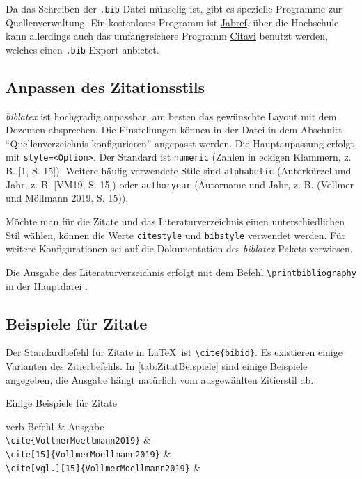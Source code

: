 Da das Schreiben der \verb|.bib|-Datei mühselig ist, gibt es spezielle Programme zur Quellenverwaltung. Ein kostenloses Programm ist \href{https://www.jabref.org/}{Jabref}, über die Hochschule kann allerdings auch das umfangreichere Programm \href{https://www.citavi.com/de}{Citavi} benutzt werden, welches einen \verb|.bib| Export anbietet.

\subsection{Anpassen des Zitationsstils}
\textit{biblatex} ist hochgradig anpassbar, am besten das gewünschte Layout mit dem Dozenten absprechen. Die Einstellungen können in der Datei  in dem Abschnitt \enquote{Quellenverzeichnis konfigurieren} angepasst werden. Die Hauptanpassung erfolgt mit \verb|style=<Option>|. Der Standard ist \verb|numeric| (Zahlen in eckigen Klammern, z. B. [1, S. 15]). Weitere häufig verwendete Stile sind \verb|alphabetic| (Autorkürzel und Jahr, z. B. [VM19, S. 15]) oder \verb|authoryear| (Autorname und Jahr, z. B. (Vollmer und Möllmann 2019, S. 15)).

Möchte man für die Zitate und das Literaturverzeichnis einen unterschiedlichen Stil wählen, können die Werte \verb|citestyle| und \verb|bibstyle| verwendet werden. Für weitere Konfigurationen sei auf die Dokumentation des \textit{biblatex} Pakets verwiesen.

Die Ausgabe des Literaturverzeichnis erfolgt mit dem Befehl \verb|\printbibliography| in der Hauptdatei .
 
\subsection{Beispiele für Zitate}
Der Standardbefehl für Zitate in \LaTeX\ ist \verb|\cite{bibid}|. Es existieren einige Varianten des Zitierbefehls. In \vref{tab:ZitatBeispiele} sind einige Beispiele angegeben, die Ausgabe hängt natürlich vom ausgewählten Zitierstil ab.

\begin{table}[h]
\centering
\caption{Einige Beispiele für Zitate}
\label{tab:ZitatBeispiele}
\begin{tblr}{verb}
	\toprule
	 Befehl & Ausgabe \\ \midrule
	\verb|\cite{VollmerMoellmann2019}| & \cite{VollmerMoellmann2019} \\
	\verb|\cite[15]{VollmerMoellmann2019}| & \cite[15]{VollmerMoellmann2019} \\
	\verb|\cite[vgl.][15]{VollmerMoellmann2019}| & \cite[vgl.][15]{VollmerMoellmann2019} \\
	\bottomrule
\end{tblr}
\end{table}


